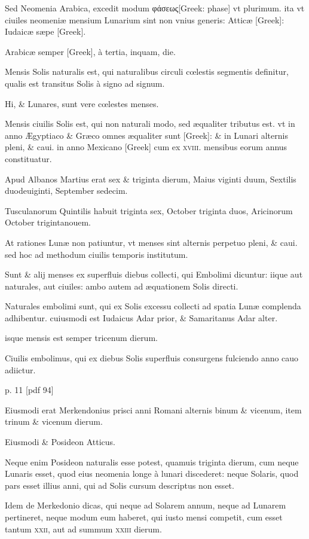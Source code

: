 Sed Neomenia Arabica, excedit modum
 \textgreek{φάσεως[Greek: phase]} vt plurimum. ita vt
ciuiles neomeniæ mensium Lunarium sint non vnius generis: Atticæ 
\textgreek{[Greek]}: Iudaicæ sæpe \textgreek{[Greek]}.

Arabicæ semper \textgreek{[Greek]},
à tertia, inquam, die.

Mensis Solis naturalis est,
qui naturalibus circuli cœlestis segmentis definitur, qualis est transitus
Solis à signo ad signum.

Hi, \& Lunares, sunt vere cœlestes menses.

Mensis ciuilis Solis est, qui non naturali modo, sed æqualiter tributus
est. vt in anno Ægyptiaco \& Græco omnes æqualiter sunt \textgreek{[Greek]}:
\& in Lunari alternis pleni, \& caui. in anno Mexicano \textgreek{[Greek]}
cum ex \textsc{xviii}. mensibus eorum annus constituatur.

Apud Albanos
Martius erat sex \& triginta dierum, Maius viginti duum, Sextilis
duodeuiginti, September sedecim.

Tusculanorum Quintilis habuit
triginta sex, October triginta duos, Aricinorum October trigintanouem.

At rationes Lunæ non patiuntur, vt menses sint alternis
perpetuo pleni, \& caui. sed hoc ad methodum ciuilis temporis institutum.

Sunt \& alij menses ex superfluis diebus collecti, qui Embolimi
dicuntur: iique aut naturales, aut ciuiles: ambo autem ad æquationem
Solis directi.

Naturales embolimi sunt, qui ex Solis excessu collecti
ad spatia Lunæ complenda adhibentur. cuiusmodi est Iudaicus
Adar prior, \& Samaritanus Adar alter.

isque mensis est semper tricenum dierum.

Ciuilis embolimus, qui ex diebus Solis superfluis consurgens
fulciendo anno cauo adiictur.



p. 11 [pdf 94]


Eiusmodi erat Merkendonius 
prisci anni Romani alternis binum \& vicenum, item trinum \& vicenum
dierum.

Eiusmodi \& Posideon Atticus.

Neque enim Posideon
naturalis esse potest, quamuis triginta dierum, cum neque Lunaris
esset, quod eius neomenia longe à lunari discederet: neque Solaris,
quod pars esset illius anni, qui ad Solis cursum descriptus non esset.

Idem de Merkedonio dicas, qui neque ad Solarem annum, neque ad
Lunarem pertineret, neque modum eum haberet, qui iusto mensi
competit, cum esset tantum \textsc{xxii}, aut ad summum \textsc{xxiii} dierum.

